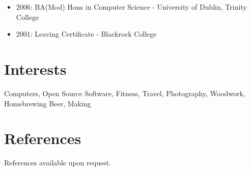 \documentclass[a4paper, 10pt] {article}
\begin{document}
\begin{itemize}[itemsep=2pt,parsep=2pt]
  \item 2006: BA(Mod) Hons in Computer Science - University of Dublin, Trinity College
  \item 2001: Leaving Certificate - Blackrock College
\end{itemize}

\hrulefill

\section*{Interests}

Computers, Open Source Software, Fitness, Travel, Photography, Woodwork, Homebrewing Beer, Making

\hrulefill

\section*{References}

References available upon request.
\end{document}
